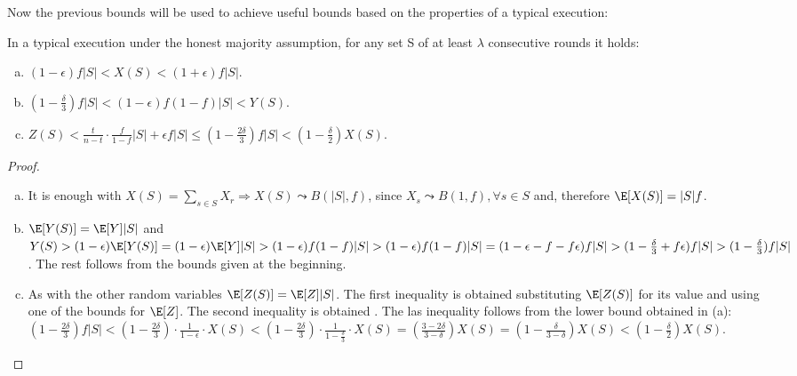\documentclass[..]{subfiles}
\begin{document}
Now the previous bounds will be used to achieve useful bounds based on the properties of a typical execution:
\begin{lemma}\label{typical_bounds}
	In a typical execution under the honest majority assumption, for any set S of at least $\lambda$ consecutive rounds it holds:
	\begin{enumerate}[(a)]
		\item $(1 - \epsilon)f|S| < X(S) < (1 + \epsilon)f|S|$.
		\item $(1 - \frac{\delta}{3})f|S| < (1 - \epsilon)f(1-f)|S| < Y(S)$.
		\item $Z(S) < \frac{t}{n-t} \cdot \frac{f}{1-f}|S| + \epsilon f|S| \le (1-\frac{2 \delta}{3})f|S| < (1-\frac{\delta}{2})X(S)$.
	\end{enumerate}
\end{lemma}
\mbox{}
\begin{proof}
	\mbox{}
	\begin{enumerate}[(a)]
		\item It is enough with $X(S) = \sum_{s \in S}{X_r} \Rightarrow X(S) \leadsto B(|S|,f)$, since $X_s \leadsto B(1,f), \forall s \in S$ and, therefore $\E[X(S)] = |S|f$.

		\item $\E[Y(S)] = \E[Y]|S|$ and $Y(S) > (1-\epsilon)\E[Y(S)] = (1-\epsilon)\E[Y]|S| > (1-\epsilon)f(1-f)|S| > (1-\epsilon)f(1-f)|S| = (1-\epsilon-f-f\epsilon)f|S| > (1-\frac{\delta}{3}+f\epsilon)f|S| > (1-\frac{\delta}{3})f|S|$. The rest follows from the bounds given at the beginning.

		\item As with the other random variables $\E[Z(S)] = \E[Z]|S|$. The first inequality is obtained substituting $\E[Z(S)]$ for its value and using one of the bounds for $\E[Z]$. The second inequality is obtained . The las inequality follows from the lower bound obtained in (a): $(1-\frac{2\delta}{3})f|S| < (1-\frac{2\delta}{3})\cdot \frac{1}{1-\epsilon} \cdot X(S) < (1-\frac{2\delta}{3})\cdot \frac{1}{1-\frac{\delta}{3}} \cdot X(S) = \left(\frac{3-2\delta}{3-\delta}\right) X(S) = \left(1 - \frac{\delta}{3-\delta}\right) X(S) < \left(1-\frac{\delta}{2}\right) X(S)$.
	\end{enumerate}
\end{proof}
\end{document}
